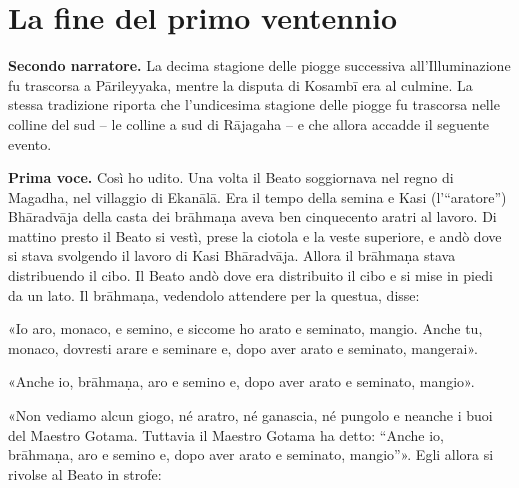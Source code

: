 \chapter{La fine del primo ventennio}

\textbf{Secondo narratore.} La decima stagione delle piogge successiva
all’Illuminazione fu trascorsa a Pārileyyaka, mentre la disputa di
Kosambī era al culmine. La stessa tradizione riporta che l’undicesima
stagione delle piogge fu trascorsa nelle colline del sud – le colline a
sud di Rājagaha – e che allora accadde il seguente evento.


\textbf{Prima voce.} Così ho udito. Una volta il Beato soggiornava nel regno di
Magadha, nel villaggio di Ekanālā. Era il tempo della semina e Kasi
(l’“aratore”) Bhāradvāja della casta dei brāhmaṇa aveva ben cinquecento
aratri al lavoro. Di mattino presto il Beato si vestì, prese la ciotola
e la veste superiore, e andò dove si stava svolgendo il lavoro di Kasi
Bhāradvāja. Allora il brāhmaṇa stava distribuendo il cibo. Il Beato andò
dove era distribuito il cibo e si mise in piedi da un lato. Il brāhmaṇa,
vedendolo attendere per la questua, disse:


«Io aro, monaco, e semino, e siccome ho arato e seminato, mangio. Anche
tu, monaco, dovresti arare e seminare e, dopo aver arato e seminato,
mangerai».


«Anche io, brāhmaṇa, aro e semino e, dopo aver arato e seminato,
mangio».


«Non vediamo alcun giogo, né aratro, né ganascia, né pungolo e neanche i
buoi del Maestro Gotama. Tuttavia il Maestro Gotama ha detto: “Anche io,
brāhmaṇa, aro e semino e, dopo aver arato e seminato, mangio”». Egli
allora si rivolse al Beato in strofe:


